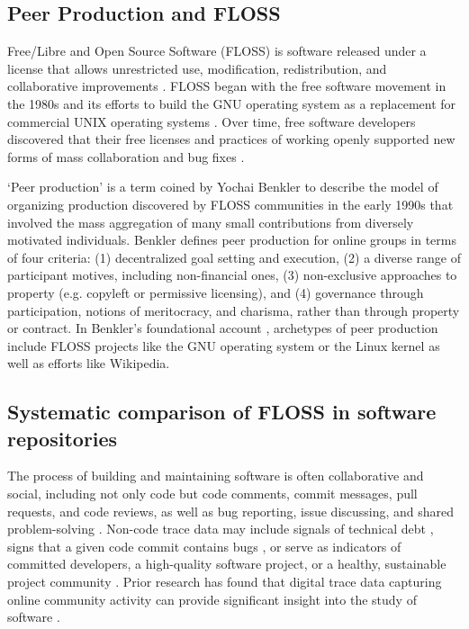 \documentclass[10pt,conference]{IEEEtran}\usepackage[]{graphicx}\usepackage[usenames,dvipsnames]{color}
\begin{document}
\subsection{Peer Production and FLOSS}
\label{sec:floss}

Free/Libre and Open Source Software (FLOSS) is software released under a license that allows unrestricted use, modification, redistribution, and collaborative improvements \cite{crowston_effective_2004}. 
FLOSS began with the free software movement in the 1980s and its efforts to build the GNU operating system as a replacement for commercial UNIX operating systems \cite{stallman_free_2002}. Over time, free software developers discovered that their free licenses and practices of working openly supported new forms of mass collaboration and bug fixes \cite{crowston_free/libre_2012}.

`Peer production' is a term coined by Yochai Benkler to describe the model of organizing production discovered by FLOSS communities in the early 1990s that involved the mass aggregation of many small contributions from diversely motivated individuals. Benkler \cite{benkler_peer_2015} defines peer production for online groups in terms of four criteria: (1) decentralized goal setting and execution, (2) a diverse range of participant motives, including non-financial ones, (3) non-exclusive approaches to property (e.g. copyleft or permissive licensing), and (4) governance through participation, notions of meritocracy, and charisma, rather than through property or contract. 
In Benkler's foundational account \cite{benkler_coases_2002}, archetypes of peer production include FLOSS projects like the GNU operating system or the Linux kernel as well as efforts like Wikipedia.

\subsection{Systematic comparison of FLOSS in software repositories}
\label{sec:repos}

The process of building and maintaining software is often collaborative and social, including not only code but code comments, commit messages, pull requests, and code reviews, as well as bug reporting, issue discussing, and shared problem-solving \cite{robles_tools_2009}. Non-code trace data may include signals of technical debt \cite{zampetti_automatically_2020}, signs that a given code commit contains bugs \cite{falcao_relating_2020}, or serve as indicators of committed developers, a high-quality software project, or a healthy, sustainable project community \cite{dabbish_social_2012, coelho_identifying_2018, valiev_ecosystem-level_2018}.
Prior research has found that digital trace data capturing online community activity can provide significant insight into the study of software \cite{dabbish_social_2012}. 
\end{document}
